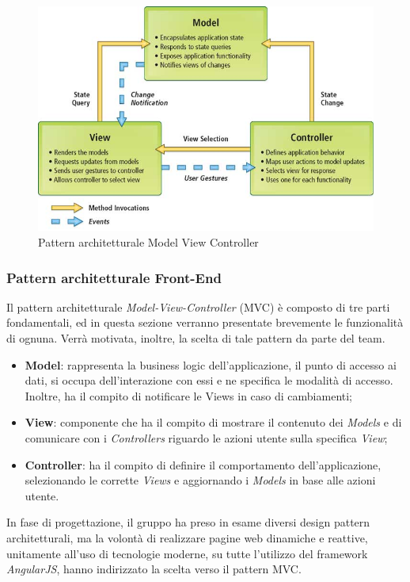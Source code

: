 \begin{figure}[H]
	\centering
	\includegraphics[width=0.7\linewidth]{IMG/MVC_pattern.jpg}
	\caption{Pattern architetturale Model View Controller}
\end{figure}

\subsubsection{Pattern architetturale Front-End}
Il pattern architetturale \textit{Model-View-Controller} (MVC) è composto di tre parti fondamentali, ed in questa sezione verranno presentate brevemente le funzionalità di ognuna. Verrà motivata, inoltre, la scelta di tale pattern da parte del team.

\begin{itemize}
	\item \textbf{Model}: rappresenta la business logic dell'applicazione, il punto di accesso ai dati, si occupa dell'interazione con essi e ne specifica le modalità di accesso. Inoltre, ha il compito di notificare le Views in caso di cambiamenti;
	\item \textbf{View}: componente che ha il compito di mostrare il contenuto dei \textit{Models} e di comunicare con i \textit{Controllers} riguardo le azioni utente sulla specifica \textit{View};
	\item \textbf{Controller}: ha il compito di definire il comportamento dell'applicazione, selezionando le corrette \textit{Views} e aggiornando i \textit{Models} in base alle azioni utente.
\end{itemize}

In fase di progettazione, il gruppo ha preso in esame diversi design pattern architetturali, ma la volontà di realizzare pagine web dinamiche e reattive, unitamente all'uso di tecnologie moderne, su tutte l'utilizzo del framework \textit{AngularJS}, hanno indirizzato la scelta verso il pattern MVC.


